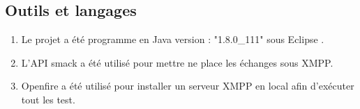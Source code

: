 \documentclass[11pt]{report}
\begin{document}
\subsection{Outils et langages} 
\begin{enumerate}
\item Le projet a été programme en Java version : "1.8.0\_111" sous Eclipse  .
\item L'API smack a été utilisé pour mettre ne place les échanges sous XMPP.
\item Openfire a été utilisé pour installer un serveur XMPP en local afin d’exécuter tout les test.
\end{enumerate}
\newpage
%
%
\end{document}
